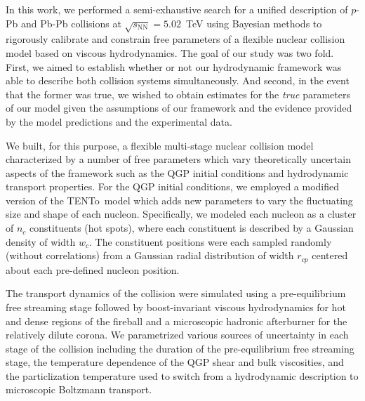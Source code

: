 \documentclass[aps,prc,reprint,amsmath,nofootinbib]{revtex4-1}
\newcommand{\trento}{T\raisebox{-0.5ex}{R}ENTo}
\newcommand{\sqrts}{\sqrt{s_\mathrm{NN}}}
\newcommand{\rc}{r_{cp}}
\newcommand{\nc}{n_c}
\newcommand{\wc}{w_c}
\begin{document}
In this work, we performed a semi-exhaustive search for a unified description of $p$-Pb and Pb-Pb collisions at $\sqrts=5.02$~TeV using Bayesian methods to rigorously calibrate and constrain free parameters of a flexible nuclear collision model based on viscous hydrodynamics.
The goal of our study was two fold.
First, we aimed to establish whether or not our hydrodynamic framework was able to describe both collision systems simultaneously.
And second, in the event that the former was true, we wished to obtain estimates for the \emph{true} parameters of our model given the assumptions of our framework and the evidence provided by the model predictions and the experimental data.

We built, for this purpose, a flexible multi-stage nuclear collision model characterized by a number of free parameters which vary theoretically uncertain aspects of the framework such as the QGP initial conditions and hydrodynamic transport properties.
For the QGP initial conditions, we employed a modified version of the \trento\ model \cite{Moreland:2014oya} which adds new parameters to vary the fluctuating size and shape of each nucleon.
Specifically, we modeled each nucleon as a cluster of $\nc$ constituents (hot spots), where each constituent is described by a Gaussian density of width $\wc$.
The constituent positions were each sampled randomly (without correlations) from a Gaussian radial distribution of width $\rc$ centered about each pre-defined nucleon position.

The transport dynamics of the collision were simulated using a pre-equilibrium free streaming stage followed by boost-invariant viscous hydrodynamics for hot and dense regions of the fireball and a microscopic hadronic afterburner for the relatively dilute corona.
We parametrized various sources of uncertainty in each stage of the collision including the duration of the pre-equilibrium free streaming stage, the temperature dependence of the QGP shear and bulk viscosities, and the particlization temperature used to switch from a hydrodynamic description to microscopic Boltzmann transport.
\end{document}
